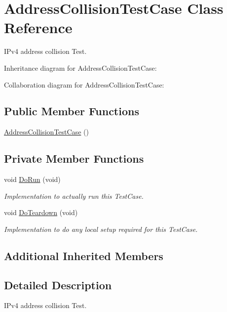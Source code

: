 \hypertarget{classAddressCollisionTestCase}{}\section{Address\+Collision\+Test\+Case Class Reference}
\label{classAddressCollisionTestCase}


I\+Pv4 address collision Test.  




Inheritance diagram for Address\+Collision\+Test\+Case\+:


Collaboration diagram for Address\+Collision\+Test\+Case\+:
\subsection*{Public Member Functions}
\begin{DoxyCompactItemize}
\item 
\hyperlink{classAddressCollisionTestCase_ad78f7e56da1f711e57022fb342cec29e}{Address\+Collision\+Test\+Case} ()
\end{DoxyCompactItemize}
\subsection*{Private Member Functions}
\begin{DoxyCompactItemize}
\item 
void \hyperlink{classAddressCollisionTestCase_a467845709a1bebb6d770afb8b2e6998b}{Do\+Run} (void)
\begin{DoxyCompactList}\small\item\em Implementation to actually run this Test\+Case. \end{DoxyCompactList}\item 
void \hyperlink{classAddressCollisionTestCase_acc84db24a2d44fa909ed0c8b2e3a771c}{Do\+Teardown} (void)
\begin{DoxyCompactList}\small\item\em Implementation to do any local setup required for this Test\+Case. \end{DoxyCompactList}\end{DoxyCompactItemize}
\subsection*{Additional Inherited Members}


\subsection{Detailed Description}
I\+Pv4 address collision Test. 

